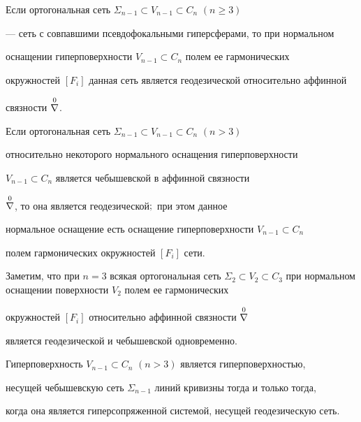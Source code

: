  


 


\begin{thm} 


Если ортогональная сеть $\Sigma_{n-1}\subset V_{n-1}\subset C_n$ $(n\ge3)$ 


--- сеть с совпавшими псевдофокальными гиперсферами, то при нормальном 


оснащении гиперповерхности $V_{n-1}\subset C_n$ полем ее гармонических 


окружностей $[F_i]$ данная сеть является геодезической относительно аффинной 


связности $\overset{0}{\nabla}{}$. 


\end{thm} 


 


 


\begin{thm} 


Если ортогональная сеть $\Sigma_{n-1}\subset V_{n-1}\subset C_n$ $(n>3)$ 


относительно некоторого нормального оснащения гиперповерхности 


$V_{n-1}\subset C_n$ является чебышевской в аффинной связности 


$\overset{0}{\nabla}{}$, то она является геодезической$;$ при этом данное 


нормальное оснащение есть оснащение гиперповерхности $V_{n-1}\subset C_n$ 


полем гармонических окружностей $[F_i]$ сети. 


\end{thm} 


 


Заметим, что при $n=3$ всякая ортогональная сеть $\Sigma_2\subset V_2\subset 


C_3$ при нормальном оснащении поверхности $V_2$ полем ее гармонических 


окружностей $[F_i]$ относительно аффинной связности $\overset{0}{\nabla}{}$ 


является геодезической и чебышевской одновременно. 


 


 


\begin{thm} 


Гиперповерхность $V_{n-1}\subset C_n$ $(n>3)$ является гиперповерхностью, 


несущей чебышевскую сеть $\Sigma_{n-1}$ линий кривизны тогда и только тогда, 


когда она является гиперсопряженной системой, несущей геодезическую сеть. 


\end{thm} 


